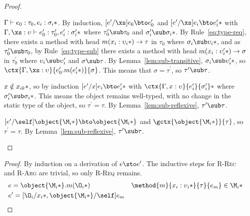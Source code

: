 \begin{theorem}[Preservation]
\begin{lemma}
\begin{proof}
\begin{match}
        $\Gamma \vdash e_0 : \tau_0, \*e_i : \sigma_i*$.  By induction,
        $[e^\prime/\xs]e_0 \bto e^\prime_0$ and $\*[e^\prime/\xs]e_i \bto
        e^\prime_i*$ with $\Gamma, \xs : \upsilon \vdash e^\prime_0 :
        \tau_0^\prime, \*e^\prime_i : \sigma_i^\prime*$ where $\tau_0^\prime \sub
        \tau_0$ and $\*\sigma_i^\prime \sub \sigma_i*$.  By
        Rule~\ref{eq:type-req}, there exists a method with head $m(\*x_i :
        \upsilon_i*) \to \tau$ in $\tau_0$ where $\*\sigma_i \sub \upsilon_i*$,
        and as $\tau_0^\prime \sub \tau_0$, by Rule~\ref{eq:type-sub} there exists
        a method with head $m(\*x_i : \upsilon_i^\prime*) \to \sigma$ in
        $\tau_0^\prime$ where $\upsilon_i \sub \upsilon_i^\prime$ and
        $\sigma \sub \tau$.  By Lemma~\ref{lem:sub-transitive}, $\*\sigma_i
        \sub \upsilon_i^\prime*$, so $\ctx{\Gamma, \xs :
        \upsilon}{e_0^\prime.m(\*e_i^\prime*)}{\sigma}$.  This means that $\sigma
        = \tau^\prime$, so $\tau^\prime \sub \tau$.

        $x \notin \*x_{ik}*$, so by induction $\*[e^\prime/x]e_i \bto e_i^\prime*$
        with $\*\ctx{\Gamma, x : \upsilon}{e_i^\prime}{\sigma_i^\prime}*$ where
        $\*\sigma_i^\prime \sub \sigma_i*$.  This means the object remains
        well-typed, with no change in the static type of the object, so
        $\tau^\prime = \tau$.  By Lemma~\ref{lem:sub-reflexive}, $\tau^\prime
        \sub \tau$.

        $[e^\prime/\self]\object{\*\M_i*} \bto \object{\*\M_i*}$ and
        $\gctx{\object{\*\M_i*}}{\tau}$, so $\tau^\prime = \tau$.  By
        Lemma~\ref{lem:sub-reflexive}, $\tau^\prime \sub \tau$.
      \end{match}
    \end{proof}
  \end{lemma}

  \begin{proof}
    By induction on a derivation of $e \sto e^\prime$.  The inductive steps for
    \textsc{R-Rec} and \textsc{R-Arg} are trivial, so only \textsc{R-Req}
    remains.
%
    \begin{align*}
      &e = \object{\*\M_i*}.m(\*\O_i*) &
      \method{m}{\*x_i : \upsilon_i*}{\tau}{e_m} \in \*\M_i* \\
      &e^\prime = [\*\O_i/x_i*, \object{\*\M_i*}/\self]e_m &
    \end{align*}


\end{proof}
\end{theorem}

